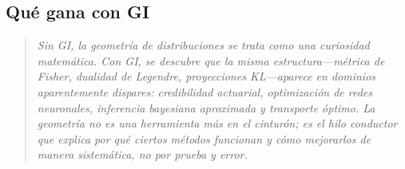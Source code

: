 \subsection*{Qué gana con GI}
\begin{quote}
	\itshape
	Sin GI, la geometría de distribuciones se trata como una curiosidad matemática.  Con GI, se descubre que la misma estructura---métrica de Fisher, dualidad de Legendre, proyecciones KL---aparece en dominios aparentemente dispares: credibilidad actuarial, optimización de redes neuronales, inferencia bayesiana aproximada y transporte óptimo.  La geometría no es una herramienta más en el cinturón; es el hilo conductor que explica por qué ciertos métodos funcionan y cómo mejorarlos de manera sistemática, no por prueba y error.
\end{quote}

